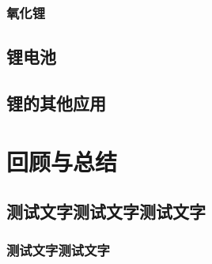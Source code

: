 \documentclass[color=orange,openany]{textbook-cn}
\begin{document}
\subsubsection{氧化锂}
\lipsum[1-2]
\subsection{锂电池}
\lipsum[1-2]
\subsection{锂的其他应用}
\lipsum[1-2]

\begin{Exercise}
\begin{QsNum}
\item \lipsum[1][1-2]
\item \lipsum[1][1-2]
\item \lipsum[1][1-2]
\item \lipsum[1][1-2]
\item \lipsum[1][1-2]
\item \lipsum[1][1-2]
\item \lipsum[1][1-2]
\item \lipsum[1][1-2]
\end{QsNum}
\tcblower
\lipsum[1]
\end{Exercise}


\section{回顾与总结}

\begin{Point*}
\lipsum[2]
\end{Point*}

\begin{Case*}
\item \lipsum[1][1]
\item \lipsum[1][1]
\item \lipsum[1][1]
\end{Case*}

\subsection{测试文字测试文字测试文字}


\subsubsection*{测试文字测试文字}
\lipsum[1-2]
\end{document}
